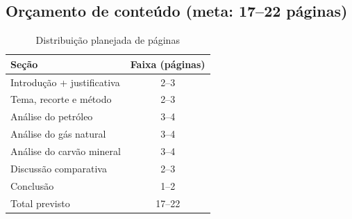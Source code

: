 \subsection{Or\c{c}amento de conte\'udo (meta: 17--22 p\'aginas)}
\begin{table}[h]
\centering
\caption{Distribui\c{c}\~ao planejada de p\'aginas}
\begin{tabular}{lc}
\toprule
Se\c{c}\~ao & Faixa (p\'aginas) \\
\midrule
Introdu\c{c}\~ao + justificativa & 2--3 \\
Tema, recorte e m\'etodo & 2--3 \\
An\'alise do petr\'oleo & 3--4 \\
An\'alise do g\'as natural & 3--4 \\
An\'alise do carv\~ao mineral & 3--4 \\
Discuss\~ao comparativa & 2--3 \\
Conclus\~ao & 1--2 \\
\midrule
Total previsto & 17--22 \\
\bottomrule
\end{tabular}
\end{table}
